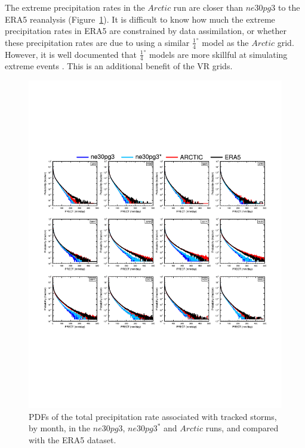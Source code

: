 \documentclass[draft]{agujournal2019}
\begin{document}
The extreme precipitation rates in the $Arctic$ run are closer than $ne30pg3$ to the ERA5 reanalysis (Figure~\ref{fig:comp-pdf}). It is difficult to know how much the extreme precipitation rates in ERA5 are constrained by data assimilation, or whether these precipitation rates are due to using a similar $\frac{1}{4}^{\circ}$ model as the $Arctic$ grid. However, it is well documented that $\frac{1}{4}^{\circ}$ models are more skillful at simulating extreme events \cite{BetAl2013JC,OETAL2016JAMES}.  This is an additional benefit of the VR grids.

\begin{figure}[t]
\begin{center}
         \includegraphics[width=130mm]{figs/temp_composite_ge45N_pdf.pdf}
\end{center}
\caption{PDFs of the total precipitation rate associated with tracked storms, by month, in the $ne30pg3$, $ne30pg3^{*}$ and $Arctic$ runs, and compared with the ERA5 dataset.}
\label{fig:comp-pdf}
\end{figure}
\end{document}
